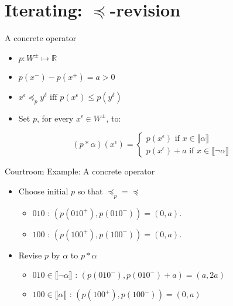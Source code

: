 \documentclass[11pt]{beamer}
\newcommand{\modelsOf}[1]{\llbracket #1 \rrbracket}
\begin{document}
\section{Iterating: $\preceq$-revision}

\begin{frame}{A concrete operator}
    \begin{itemize}
        \item $p: W^{\pm} \mapsto \mathds{R}$
        \item $p(x^{-}) - p(x^{+}) = a > 0$
        \item $x^{\epsilon} \preceq_{p} y^{\delta} \textrm{ iff } p(x^{\epsilon}) \leq p(y^{\delta})$
        \item Set $p$, for every $x^{\epsilon} \in W^{\pm}$, to:
    \end{itemize}
    
    \begin{equation*}
        (p \ast \alpha)(x^{\epsilon}) = \left\{
                        \begin{array}{ll}
                          p(x^{\epsilon}) \textrm{ if } x \in \modelsOf{\alpha}\\
                          p(x^{\epsilon}) + a \textrm{ if } x \in \modelsOf{\neg\alpha}
                        \end{array}
                      \right.
    \end{equation*}
    
\end{frame}

\begin{frame}{Courtroom Example: A concrete operator}
    \begin{itemize}
        \item Choose initial $p$ so that $\preceq_{p} = \preceq$
        \begin{itemize}
            \item $010 \textrm{ : } (p(010^{+}), p(010^{-})) = (0, a)$.
            \item $100 \textrm{ : } (p(100^{+}), p(100^{-})) = (0, a)$.
        \end{itemize}
        \item Revise $p$ by $\alpha$ to $p \ast \alpha$
        \begin{itemize}
            \item $010 \in \modelsOf{\neg\alpha} \textrm{ : } (p(010^{-}), p(010^{-}) + a) = (a, 2a)$
            \item $100 \in \modelsOf{\alpha} \textrm{ : } (p(100^{+}), p(100^{-})) = (0, a)$
        \end{itemize}
            \end{itemize}

\end{frame}
\end{document}
